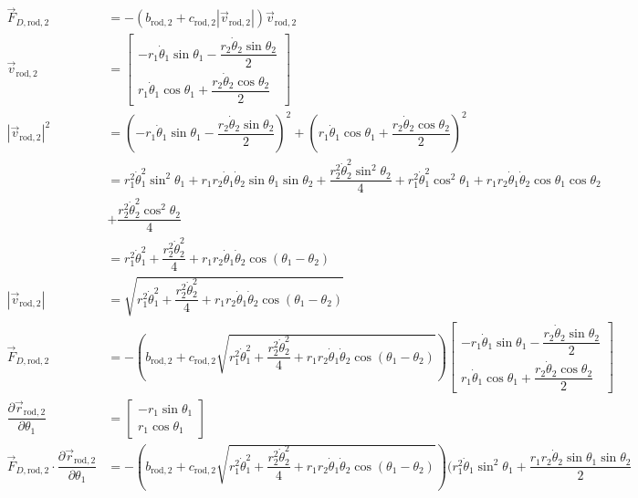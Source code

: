 \documentclass[12pt,a4paper,portrait]{article}
\begin{document}
	\begin{align*}
		\vec{F}_{D,\mathrm{rod}, 2} &= -\left(b_{\mathrm{rod}, 2} + c_{\mathrm{rod}, 2}|\vec{v}_{\mathrm{rod}, 2}|\right)\vec{v}_{\mathrm{rod}, 2} \\
		\vec{v}_{\mathrm{rod}, 2} &= \begin{bmatrix}
			-r_1 \dot{\theta}_1\sin{\theta_1} - \dfrac{r_2\dot{\theta}_2\sin{\theta_2}}{2}\\
			r_1 \dot{\theta}_1 \cos{\theta_1} + \dfrac{r_2\dot{\theta}_2\cos{\theta_2}}{2}
		\end{bmatrix} \\
		|\vec{v}_{\mathrm{rod}, 2}|^2 &= \left(	-r_1 \dot{\theta}_1\sin{\theta_1} - \dfrac{r_2\dot{\theta}_2\sin{\theta_2}}{2}\right)^2 + \left(r_1 \dot{\theta}_1 \cos{\theta_1} + \dfrac{r_2\dot{\theta}_2\cos{\theta_2}}{2}\right)^2 \\
		&= r_1^2 \dot{\theta}_1^2 \sin^2{\theta_1} + r_1 r_2 \dot{\theta}_1 \dot{\theta}_2\sin{\theta_1}\sin{\theta_2} + \dfrac{r_2^2 \dot{\theta}_2^2 \sin^2{\theta_2}}{4} + r_1^2 \dot{\theta}_1^2 \cos^2{\theta_1} + r_1r_2 \dot{\theta}_1 \dot{\theta}_2 \cos{\theta_1}\cos{\theta_2}\\
		&+ \dfrac{r_2^2 \dot{\theta}_2^2 \cos^2{\theta_2}}{4} \\
		&= r_1^2 \dot{\theta}_1^2 + \dfrac{r_2^2 \dot{\theta}_2^2}{4} + r_1 r_2 \dot{\theta}_1 \dot{\theta}_2 \cos{(\theta_1 -\theta_2)} \\
		|\vec{v}_{\mathrm{rod}, 2}| &= \sqrt{r_1^2 \dot{\theta}_1^2 + \dfrac{r_2^2 \dot{\theta}_2^2}{4} + r_1 r_2 \dot{\theta}_1 \dot{\theta}_2 \cos{(\theta_1 -\theta_2)}} \\
		\vec{F}_{D,\mathrm{rod}, 2} &= -\left(b_{\mathrm{rod}, 2} + c_{\mathrm{rod}, 2}\sqrt{r_1^2 \dot{\theta}_1^2 + \dfrac{r_2^2 \dot{\theta}_2^2}{4} + r_1 r_2 \dot{\theta}_1 \dot{\theta}_2 \cos{(\theta_1 -\theta_2)}}\right)\begin{bmatrix}
			-r_1 \dot{\theta}_1\sin{\theta_1} - \dfrac{r_2\dot{\theta}_2\sin{\theta_2}}{2}\\
			r_1 \dot{\theta}_1 \cos{\theta_1} + \dfrac{r_2\dot{\theta}_2\cos{\theta_2}}{2}
		\end{bmatrix} \\
		\dfrac{\partial \vec{r}_{\mathrm{rod}, 2}}{\partial \theta_1} &= \begin{bmatrix}
			-r_1 \sin{\theta_1} \\
			r_1 \cos{\theta_1}
		\end{bmatrix}\\
		\vec{F}_{D,\mathrm{rod}, 2}\cdot \dfrac{\partial \vec{r}_{\mathrm{rod}, 2}}{\partial \theta_1} &= -\left(b_{\mathrm{rod}, 2} + c_{\mathrm{rod}, 2}\sqrt{r_1^2 \dot{\theta}_1^2 + \dfrac{r_2^2 \dot{\theta}_2^2}{4} + r_1 r_2 \dot{\theta}_1 \dot{\theta}_2 \cos{(\theta_1 -\theta_2)}}\right) (r_1^2 \dot{\theta}_1 \sin^2{\theta_1} + \dfrac{r_1 r_2 \dot{\theta}_2 \sin{\theta_1}\sin{\theta_2}}{2} \\

\end{align*}
\end{document}
